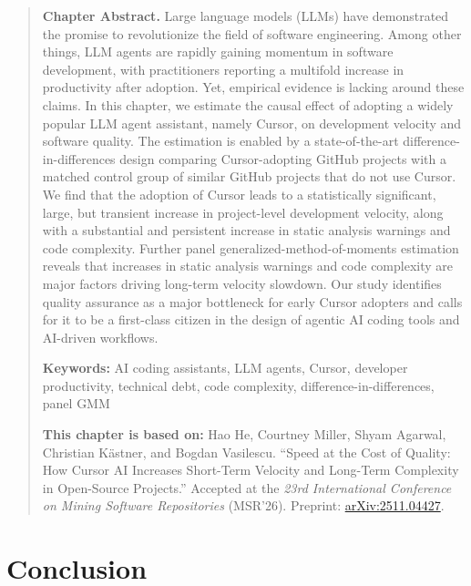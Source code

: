 \documentclass[12pt, openany]{cmuthesis}
\newcommand{\chapterfrontmatter}[3]{%
    \vspace{1em}%
    \begingroup
    \begin{quote}
    \noindent\textbf{Chapter Abstract.} #1\par
    \vspace{0.8em}%
    \noindent\textbf{Keywords:} #2\par
    \vspace{0.8em}%
    \noindent\textbf{This chapter is based on:} #3\par
    \end{quote}
    \endgroup
    \vspace{1em}%
}
\begin{document}
\chapterfrontmatter{%
Large language models (LLMs) have demonstrated the promise to revolutionize the field of software engineering.
Among other things, LLM agents are rapidly gaining momentum in software development, with practitioners reporting a multifold increase in productivity after adoption.
Yet, empirical evidence is lacking around these claims.
In this chapter, we estimate the causal effect of adopting a widely popular LLM agent assistant, namely Cursor, on development velocity and software quality.
The estimation is enabled by a state-of-the-art difference-in-differences design comparing Cursor-adopting GitHub projects with a matched control group of similar GitHub projects that do not use Cursor.
We find that the adoption of Cursor leads to a statistically significant, large, but transient increase in project-level development velocity, along with a substantial and persistent increase in static analysis warnings and code complexity.
Further panel generalized-method-of-moments estimation reveals that increases in static analysis warnings and code complexity are major factors driving long-term velocity slowdown.
Our study identifies quality assurance as a major bottleneck for early Cursor adopters and calls for it to be a first-class citizen in the design of agentic AI coding tools and AI-driven workflows.%
}{%
AI coding assistants, LLM agents, Cursor, developer productivity, technical debt, code complexity, difference-in-differences, panel GMM%
}{%
Hao He, Courtney Miller, Shyam Agarwal, Christian K\"astner, and Bogdan Vasilescu.
``Speed at the Cost of Quality: How Cursor AI Increases Short-Term Velocity and Long-Term Complexity in Open-Source Projects.''
Accepted at the \emph{23rd International Conference on Mining Software Repositories} (MSR'26).
Preprint: \href{https://arxiv.org/abs/2511.04427}{arXiv:2511.04427}.%
}



\chapter{Conclusion}
\label{chp:conclusion}



\chapter{\bibname}
\printbibliography[heading=none]

\end{document}
